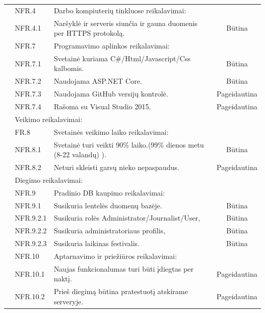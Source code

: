 \documentclass{VUMIFPSkursinis}
\begin{document}
\begin{longtable}{|p{1cm}|p{3cm}|p{9cm}|c|}
 &  \cellcolor{light-gray}NFR.4 & \multicolumn{2}{l|}{ \cellcolor{light-gray}Darbo kompiuterių tinkluose reikalavimai:} \\ \cline{2-4} 
 & NFR.4.1 & Naršyklė ir serveris siunčia ir gauna duomenis per HTTPS protokolą. & Būtina \\ \cline{2-4} 
 &  \cellcolor{light-gray}NFR.7 & \multicolumn{2}{l|}{ \cellcolor{light-gray}Programavimo aplinkos reikalavimai:} \\ \cline{2-4} 
 & NFR.7.1 & Svetainė kuriama C\#/Html/Javascript/Css kalbomis. & Būtina \\ \cline{2-4} 
 & NFR.7.2 & Naudojama ASP.NET Core. & Būtina \\ \cline{2-4} 
 & NFR.7.3 & Naudojama GitHub versijų kontrolė. & Pageidautina \\ \cline{2-4} 
 & NFR.7.4 & Rašoma su Visual Studio 2015. & Pageidautina \\ \cline{2-4} 
 &  \multicolumn{3}{l|}{ \cellcolor{light-gray}Veikimo reikalavimai:} \\ \cline{2-4} 
 &  \cellcolor{light-gray}FR.8 & \multicolumn{2}{l|}{ \cellcolor{light-gray}Svetainės veikimo laiko reikalavimai:} \\ \cline{2-4} 
 & NFR.8.1 & Svetainė turi veikti 90\% laiko.(99\% dienos metu (8-22 valandų) ). & Būtina \\ \cline{2-4} 
 & NFR.8.2 & Neturi skleisti garsų nieko nepaspaudus. & Pageidautina \\ \cline{2-4} 
 & \multicolumn{3}{l|}{ \cellcolor{light-gray}Diegimo reikalavimai:} \\ \cline{2-4} 
 &  \cellcolor{light-gray}NFR.9 & \multicolumn{2}{l|}{ \cellcolor{light-gray}Pradinio DB kaupimo reikalavimai:} \\ \cline{2-4} 
 & NFR.9.1 & Susikuria lentelės duomenų bazėje. & Būtina \\ \cline{2-4} 
 & NFR.9.2.1 & Susikuria rolės Administrator/Journalist/User, & Būtina \\ \cline{2-4} 
 & NFR.9.2.2 & Susikuria administratoriaus profilis, & Būtina \\ \cline{2-4} 
 & NFR.9.2.3 & Susikuria laikinas festivalis. & Būtina \\ \cline{2-4} 
 &  \cellcolor{light-gray}NFR.10 & \multicolumn{2}{l|}{ \cellcolor{light-gray}Aptarnavimo ir priežiūros reikalavimai:} \\ \cline{2-4} 
 & NFR.10.1 & Naujas funkcionalumas turi būti įdiegtas per naktį. & Pageidautina \\ \cline{2-4} 
 & NFR.10.2 & Prieš diegimą būtina pratestuotį atskirame serveryje. & Pageidautina \\ \cline{2-4} 

\end{longtable}
\end{document}
